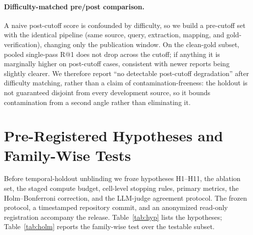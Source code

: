 \documentclass[letterpaper]{article} %
\begin{document}
\paragraph{Difficulty-matched pre/post comparison.}
A naive post-cutoff score is confounded by difficulty, so we build a pre-cutoff
set with the identical pipeline (same source, query, extraction, mapping, and
gold-verification), changing only the publication window. On the clean-gold
subset, pooled single-pass R@1 does not drop across the cutoff; if anything it is
marginally higher on post-cutoff cases, consistent with newer reports being
slightly clearer. We therefore report ``no detectable post-cutoff degradation''
after difficulty matching, rather than a claim of contamination-freeness: the
holdout is not guaranteed disjoint from every development source, so it bounds
contamination from a second angle rather than eliminating it.

\section{Pre-Registered Hypotheses and Family-Wise Tests}
\label{app:hypotheses}

Before temporal-holdout unblinding we froze hypotheses H1--H11, the ablation
set, the staged compute budget, cell-level stopping rules, primary metrics, the
Holm--Bonferroni correction, and the LLM-judge agreement protocol. The frozen
protocol, a timestamped repository commit, and an anonymized read-only
registration accompany the release. Table~\ref{tab:hyp} lists the hypotheses;
Table~\ref{tab:holm} reports the family-wise test over the testable subset.
\end{document}
